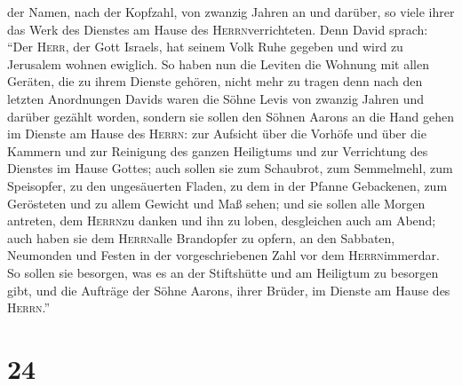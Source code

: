 der Namen, nach der Kopfzahl, von zwanzig Jahren an und darüber, so
viele ihrer das Werk des Dienstes am Hause des
\textsc{Herrn}verrichteten.  Denn David sprach: ``Der
\textsc{Herr}, der Gott Israels, hat seinem Volk Ruhe gegeben und wird
zu Jerusalem wohnen ewiglich.  So haben nun die Leviten
die Wohnung mit allen Geräten, die zu ihrem Dienste gehören, nicht mehr
zu tragen  denn nach den letzten Anordnungen Davids waren
die Söhne Levis von zwanzig Jahren und darüber gezählt worden,
 sondern sie sollen den Söhnen Aarons an die Hand gehen
im Dienste am Hause des \textsc{Herrn}: zur Aufsicht über die Vorhöfe
und über die Kammern und zur Reinigung des ganzen Heiligtums und zur
Verrichtung des Dienstes im Hause Gottes;  auch sollen
sie zum Schaubrot, zum Semmelmehl, zum Speisopfer, zu den ungesäuerten
Fladen, zu dem in der Pfanne Gebackenen, zum Gerösteten und zu allem
Gewicht und Maß sehen;  und sie sollen alle Morgen
antreten, dem \textsc{Herrn}zu danken und ihn zu loben, desgleichen auch
am Abend;  auch haben sie dem \textsc{Herrn}alle
Brandopfer zu opfern, an den Sabbaten, Neumonden und Festen in der
vorgeschriebenen Zahl vor dem \textsc{Herrn}immerdar.  So
sollen sie besorgen, was es an der Stiftshütte und am Heiligtum zu
besorgen gibt, und die Aufträge der Söhne Aarons, ihrer Brüder, im
Dienste am Hause des \textsc{Herrn}.''

\hypertarget{section-23}{%
\section{24}\label{section-23}}

